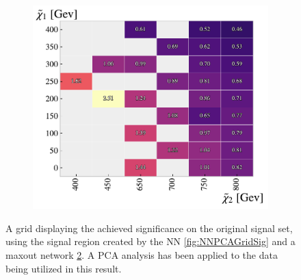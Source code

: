 \begin{figure}[H]
{\begin{subfigure}{.5\textwidth}
        \includegraphics[width=\textwidth]{Figures/MLResults/NN/SUSY/Grid/MaxOutPCAGridSig.pdf}
        \caption{}
        \label{fig:MaxOutPCAGridSig}
    \end{subfigure}
    }
    \caption{A grid displaying the achieved significance on the original signal set, using the signal region 
    created by the \ac{NN} \ref{fig:NNPCAGridSig} and a maxout network \ref{fig:MaxOutPCAGridSig}. A \ac{PCA} 
    analysis has been applied to the data being utilized in this result.}
\end{figure}

